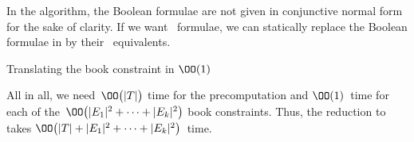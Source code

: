 \begin{myproof}
In the algorithm, the Boolean formulae are not given in conjunctive normal
form for the sake of clarity. If we want \CNF~formulae, we can statically replace
the Boolean formulae in  by their \CNF~equivalents.


\SetAlFnt{\footnotesize\sffamily}
\begin{Ualgorithm}[\placement]
\caption[Translating the book constraint in $\OO(1)$]{Translating the book constraint in $\OO(1)$ }
\label{alg:translate}




\BlankLine

\end{Ualgorithm}

All in all, we need~$\OO\bigl(|T|\bigr)$ time for the precomputation and
$\OO(1)$~time for each of the~$\OO\bigl(|E_1|^2+\dotsb+|E_k|^2\bigr)$ book constraints.
Thus, the reduction to \probQTreeSat takes $\OO\bigl(|T| + |E_1|^2 + \dotsb + |E_k|^2\bigr)$~time.\qedhere

\end{myproof}

